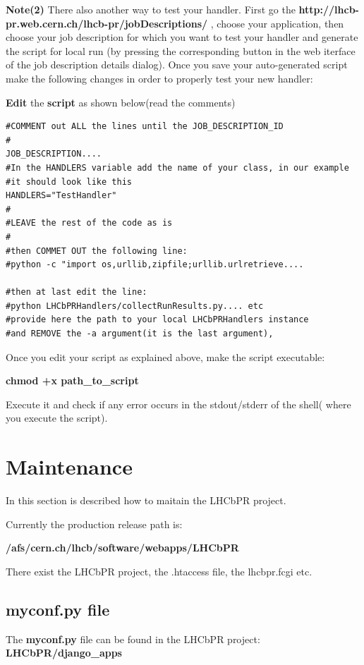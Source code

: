 \documentclass{lhcbnote}
\begin{document}
\textbf{Note(2)}
There also another way to test your handler. First go the \textbf{http://lhcb-pr.web.cern.ch/lhcb-pr/jobDescriptions/} , choose your application, then choose your job description for which you want to test your handler and generate the script for local run (by pressing the corresponding button in the web iterface of the job description details dialog). Once you save your auto-generated script make the following changes in order to properly test your new handler:

\textbf{Edit} the \textbf{script} as shown below(read the comments)
\begin{verbatim}
#COMMENT out ALL the lines until the JOB_DESCRIPTION_ID
#
JOB_DESCRIPTION....
#In the HANDLERS variable add the name of your class, in our example
#it should look like this
HANDLERS="TestHandler"
#
#LEAVE the rest of the code as is
#
#then COMMET OUT the following line:
#python -c "import os,urllib,zipfile;urllib.urlretrieve....

#then at last edit the line:
#python LHCbPRHandlers/collectRunResults.py.... etc
#provide here the path to your local LHCbPRHandlers instance 
#and REMOVE the -a argument(it is the last argument), 
\end{verbatim}

Once you edit your script as explained above, make the script executable:

\textbf{chmod +x path\_to\_script}

Execute it and check if any error occurs in the stdout/stderr of the shell( where you execute the script).

\section {Maintenance}

In this section is described how to maitain the LHCbPR project.

\vspace {2mm}

Currently the production release path is: 

{\bf /afs/cern.ch/lhcb/software/webapps/LHCbPR}

There exist the LHCbPR project, the .htaccess file, the lhcbpr.fcgi etc.

\subsection{myconf.py file}

The {\bf myconf.py} file can be found in the LHCbPR project: {\bf LHCbPR/django\_apps}
\end{document}
